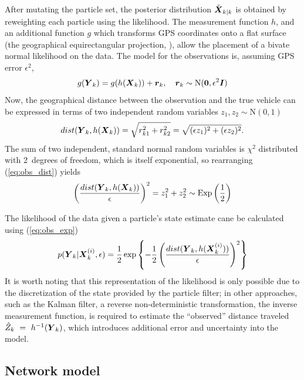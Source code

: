 After mutating the particle set, the posterior distribution $\tilde{\mbox{$\boldsymbol{X}$}}_{k|k}$ 
is obtained by reweighting each particle using the likelihood.
The measurement function $h$,
and an additional function $g$ which transforms GPS coordinates onto a flat
surface (the geographical equirectangular projection, \cite{Snyder_1998}),
allow the placement of a bivate normal likelihood on the data.
The model for the observations is,
assuming GPS error $\epsilon^2$,
\begin{equation}
\label{eq:pf_obs_model}
g(\mbox{$\boldsymbol{Y}$}_k) = g(h(\mbox{$\boldsymbol{X}$}_k)) + \boldsymbol{r}_k,
\quad \boldsymbol{r}_k \sim \mathrm{N}(\boldsymbol{0}, \epsilon^2\boldsymbol{I})
\end{equation}
Now, the geographical distance between the observation and the true vehicle can be expressed
in terms of two independent random variables $z_1, z_2 \sim \mathrm{N}(0,1)$
\begin{equation}
\label{eq:obs_dist}
dist(\mbox{$\boldsymbol{Y}$}_k, h(\mbox{$\boldsymbol{X}$}_k)) = \sqrt{r_{k1}^2 + r_{k2}^2} 
    = \sqrt{(\epsilon z_1)^2 + (\epsilon z_2)^2}.
\end{equation}
The sum of two independent, standard normal random variables 
is $\chi^2$ distributed with 2~degrees of freedom,
which is itself exponential,
so rearranging (\ref{eq:obs_dist}) yields
\begin{equation}
\label{eq:obs_exp}
\left(\frac{dist(\mbox{$\boldsymbol{Y}$}_k, h(\mbox{$\boldsymbol{X}$}_k))}{\epsilon}\right)^2 =
z_1^2 + z_2^2 \sim \mathrm{Exp}\left(\frac{1}{2}\right)
\end{equation}

The likelihood of the data given a particle's state estimate 
cane be calculated using (\ref{eq:obs_exp})
\begin{equation}
p(\mbox{$\boldsymbol{Y}$}_k | \mbox{$\boldsymbol{X}$}_k^{(i)}, \epsilon) =
\frac{1}{2}\exp\left\{
-\frac{1}{2} \left(\frac{dist(\mbox{$\boldsymbol{Y}$}_k, h(\mbox{$\boldsymbol{X}$}_k^{(i)}))}{\epsilon}\right)^2
\right\}
\end{equation}
It is worth noting that this representation of the likelihood is only
possible due to the discretization of the state provided by the particle filter;
in other approaches, such as the Kalman filter,
a reverse non-deterministic transformation,
the inverse measurement function,
is required to estimate the ``observed'' distance traveled $\hat Z_k~=~h^{-1}(\mbox{$\boldsymbol{Y}$}_k)$, 
which introduces additional error and uncertainty into the model.



\subsection{Network model}
\label{sec:kf}

